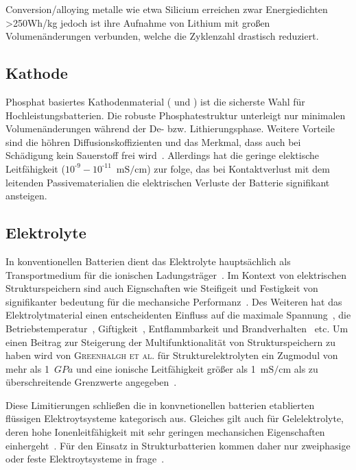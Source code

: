 

Conversion/alloying metalle wie etwa Silicium erreichen zwar Energiedichten >250Wh/kg jedoch ist ihre Aufnahme von Lithium mit großen Volumenänderungen verbunden, welche die Zyklenzahl drastisch reduziert.

\subsection{Kathode}

Phosphat basiertes Kathodenmaterial ( und ) ist die sicherste Wahl für Hochleistungsbatterien. Die robuste Phosphatestruktur unterleigt nur minimalen Volumenänderungen während der De- bzw. Lithierungsphase. Weitere Vorteile sind die höhren Diffusionskoffizienten und das Merkmal, dass auch bei Schädigung kein Sauerstoff frei wird~\cite{Ling2021}. Allerdings hat die geringe elektische Leitfähigkeit ($10^{\text{-}9}-10^{\text{-}11}$~$\si{\milli \siemens \per \cm}$) zur folge, das bei Kontaktverlust mit dem leitenden Passivematerialien die elektrischen Verluste der Batterie signifikant ansteigen.

\subsection{Elektrolyte}
In konventionellen Batterien dient das Elektrolyte hauptsächlich als Transportmedium für die ionischen Ladungsträger~\cite{Gerlach2020}. Im Kontext von elektrischen Strukturspeichern sind auch Eignschaften wie Steifigeit und Festigkeit von signifikanter bedeutung für die mechansiche Performanz~\cite{Greenhalgh2023}. Des Weiteren hat das Elektrolytmaterial einen entscheidenten Einfluss auf die maximale Spannung~\cite{Xu2016}, die 
Betriebstemperatur~\cite{Chen2022a}, Giftigkeit~\cite{Beard2019}, Entflammbarkeit und Brandverhalten~\cite{Roth2012} etc. Um einen Beitrag zur Steigerung der Multifunktionalität von Strukturspeichern zu haben wird von \textsc{Greenhalgh et al.} für Strukturelektrolyten ein Zugmodul von mehr als 1~$\si{GPa}$ und eine ionische Leitfähigkeit größer als 1~$\si{\milli \siemens \per \cm}$ als zu überschreitende Grenzwerte angegeben~\cite{Greenhalgh2023}.

Diese Limitierungen schließen die in konvnetionellen batterien etablierten flüssigen Elektroytsysteme kategorisch aus. Gleiches gilt auch für Gelelektrolyte, deren hohe Ionenleitfähigkeit mit sehr geringen mechansichen Eigenschaften einhergeht~\cite{Gayet2009, Li2018, Zhao2020a}. Für den Einsatz in Strukturbatterien kommen daher nur zweiphasige oder feste Elektroytsysteme in frage~\cite{Greenhalgh2023}.

